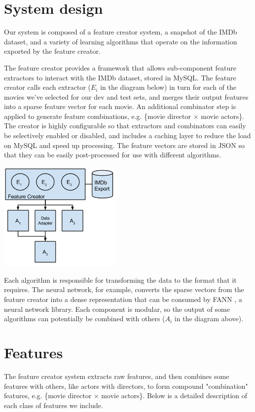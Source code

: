 \documentclass[journal]{IEEEtran}
\begin{document}
\section{System design}
Our system is composed of a feature creator system, a snapshot of the IMDb dataset,
and a variety of learning algorithms that operate on the information exported by
the feature creator.
\par The feature creator provides a framework that allows sub-component
feature extractors to interact with the IMDb dataset, stored in MySQL.  The feature
creator calls each extractor ($E_i$ in the diagram below) in turn for each of the movies we've selected for our
dev and test sets, and merges their output features into a sparse feature vector for
each movie.  An additional combinator step is applied to generate feature
combinations, e.g. \{movie director $\times$ movie actors\}.
The creator is highly configurable so that extractors and combinators can easily be selectively enabled or disabled,
and includes a caching layer to reduce the load on MySQL and speed up processing.
The feature vectors are stored in JSON so that they can be easily
post-processed for use with different algorithms. \\

\begin{center}
    \includegraphics[width=6cm]{charts/system.png}
\end{center}

Each algorithm is responsible for transforming the data to the format that it requires.
The neural network, for example, converts the sparse vectors from the feature creator
into a dense representation that can be consumed by FANN \cite{fann}, a neural network library.  Each
component is modular, so the output of some algorithms can potentially be combined with others ($A_i$ in the diagram above).

\section{Features}
The feature creator system extracts raw features, and then combines some
features with others, like actors with directors, to form compound
"combination" features, e.g. \{movie director $\times$ movie actors\}.
Below is a detailed description of each class of features we include.
\end{document}
